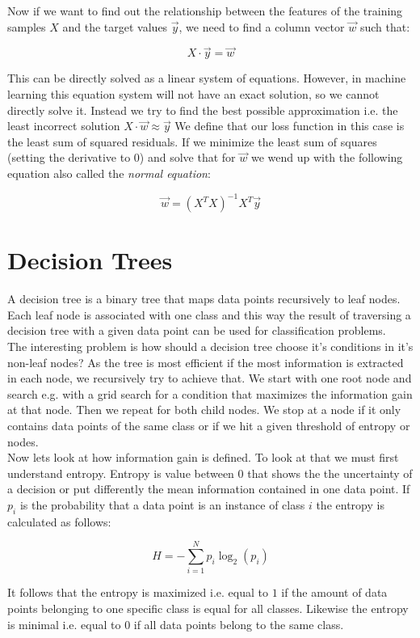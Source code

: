 Now if we want to find out the relationship between the features of the training samples $X$ and the target values $\vec{y}$, we need to find a column vector $\vec{w}$ such that:

$$
    X \cdot \vec{y} = \vec{w}
$$

This can be directly solved as a linear system of equations. However, in machine learning this equation system will not have an exact solution, so we cannot directly solve it. Instead we try to find the best possible approximation i.e. the least incorrect solution $X \cdot \vec{w} \approx \vec{y}$ We define that our loss function in this case is the least sum of squared residuals. If we minimize the least sum of squares (setting the derivative to 0) and solve that for $\vec{w}$ we wend up with the following equation also called the \textit{normal equation}:

$$
    \vec{w} = (X^T X)^{-1} X^T \vec{y}
$$

\section{Decision Trees}

A decision tree is a binary tree that maps data points recursively to leaf nodes. Each leaf node is associated with one class and this way the result of traversing a decision tree with a given data point can be used for classification problems.\\
The interesting problem is how should a decision tree choose it's conditions in it's non-leaf nodes? As the tree is most efficient if the most information is extracted in each node, we recursively try to achieve that. We start with one root node and search e.g. with a grid search for a condition that maximizes the information gain at that node. Then we repeat for both child nodes. We stop at a node if it only contains data points of the same class or if we hit a given threshold of entropy or nodes.\\

Now lets look at how information gain is defined. To look at that we must first understand entropy. Entropy is value between 0 that shows the the uncertainty of a decision or put differently the mean information contained in one data point. If $p_{i}$ is the probability that a data point is an instance of class $i$ the entropy is calculated as follows:

$$
    H = -\sum_{i=1}^{N}p_i \log_2{(p_i)}
$$

It follows that the entropy is maximized i.e. equal to $1$ if the amount of data points belonging to one specific class is equal for all classes. Likewise the entropy is minimal i.e. equal to $0$ if all data points belong to the same class.\\

